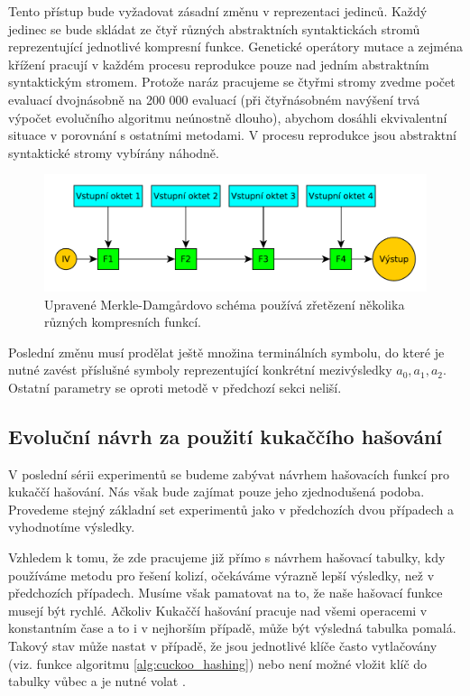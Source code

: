 Tento přístup bude vyžadovat zásadní změnu v reprezentaci jedinců. Každý jedinec se bude skládat ze čtyř 
různých abstraktních syntaktickách stromů reprezentující jednotlivé kompresní funkce. Genetické operátory
mutace a zejména křížení pracují v každém procesu reprodukce pouze nad jedním abstraktním
syntaktickým stromem. Protože naráz pracujeme se čtyřmi stromy zvedme počet evaluací dvojnásobně na
200 000 evaluací (při čtyřnásobném navýšení trvá výpočet evolučního algoritmu neúnostně dlouho),
abychom dosáhli ekvivalentní situace v porovnání s ostatními metodami. V procesu reprodukce jsou abstraktní
syntaktické stromy vybírány náhodně. 

\begin{figure}[!ht]
	\includegraphics[width=\textwidth]{fig/merkle_damgard_design2}
	\caption{Upravené Merkle-Damg\r{a}rdovo schéma používá zřetězení několika různých kompresních funkcí.}
	\label{fig:merkle_damgard_2}
\end{figure}

Poslední změnu musí prodělat ještě množina terminálních symbolu, do které je nutné zavést příslušné symboly reprezentující
konkrétní mezivýsledky $a_0, a_1, a_2$. Ostatní parametry se oproti metodě v předchozí sekci neliší.

\subsection{Evoluční návrh za použití kukaččího hašování}

V poslední sérii experimentů se budeme zabývat návrhem hašovacích funkcí pro kukaččí hašování. 
Nás však bude zajímat pouze jeho zjednodušená podoba. Provedeme stejný základní set experimentů
jako v předchozích dvou případech a vyhodnotíme výsledky.

Vzhledem k tomu, že zde pracujeme již přímo s návrhem hašovací tabulky, kdy používáme metodu pro
řešení kolizí, očekáváme výrazně lepší výsledky, než v předchozích případech. Musíme však pamatovat
na to, že naše hašovací funkce musejí být rychlé. Ačkoliv Kukaččí hašování pracuje nad všemi
operacemi v konstantním čase a to i v nejhorším případě, může být výsledná tabulka pomalá. Takový
stav může nastat v případě, že jsou jednotlivé klíče často vytlačovány (viz. funkce 
algoritmu \ref{alg:cuckoo_hashing}) nebo není možné vložit klíč do tabulky vůbec a je nutné
volat . 


